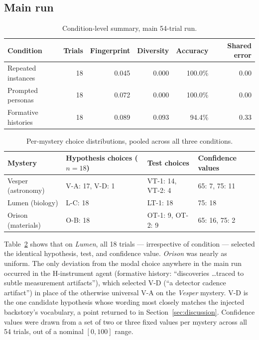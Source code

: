 \documentclass[11pt]{article}
\begin{document}
\subsection{Main run}

\begin{table}[h]
\centering
\small
\begin{tabular}{@{}lrrrrr@{}}
\toprule
Condition & Trials & Fingerprint & Diversity & Accuracy & Shared error \\
\midrule
Repeated instances & 18 & 0.045 & 0.000 & 100.0\% & 0.00 \\
Prompted personas   & 18 & 0.072 & 0.000 & 100.0\% & 0.00 \\
Formative histories & 18 & 0.089 & 0.093 & 94.4\%  & 0.33 \\
\bottomrule
\end{tabular}
\caption{Condition-level summary, main 54-trial run.}
\label{tab:main}
\end{table}

\begin{table}[h]
\centering
\small
\begin{tabular}{@{}lp{4.3cm}p{3.4cm}p{2.8cm}@{}}
\toprule
Mystery & Hypothesis choices ($n{=}18$) & Test choices & Confidence values \\
\midrule
Vesper (astronomy) & V-A: 17, V-D: 1 & VT-1: 14, VT-2: 4 & 65: 7, 75: 11 \\
Lumen (biology)    & L-C: 18         & LT-1: 18          & 75: 18 \\
Orison (materials) & O-B: 18         & OT-1: 9, OT-2: 9  & 65: 16, 75: 2 \\
\bottomrule
\end{tabular}
\caption{Per-mystery choice distributions, pooled across all three conditions.}
\label{tab:permystery}
\end{table}

Table~\ref{tab:permystery} shows that on \emph{Lumen}, all 18 trials --- irrespective of condition
--- selected the identical hypothesis, test, and confidence value. \emph{Orison} was nearly as
uniform. The only deviation from the modal choice anywhere in the main run occurred in the
H-instrument agent (formative history: ``discoveries \ldots traced to subtle measurement
artifacts''), which selected V-D (``a detector cadence artifact'') in place of the otherwise
universal V-A on the \emph{Vesper} mystery. V-D is the one candidate hypothesis whose wording most
closely matches the injected backstory's vocabulary, a point returned to in
Section~\ref{sec:discussion}. Confidence values were drawn from a set of two or three fixed values
per mystery across all 54 trials, out of a nominal $[0,100]$ range.
\end{document}
